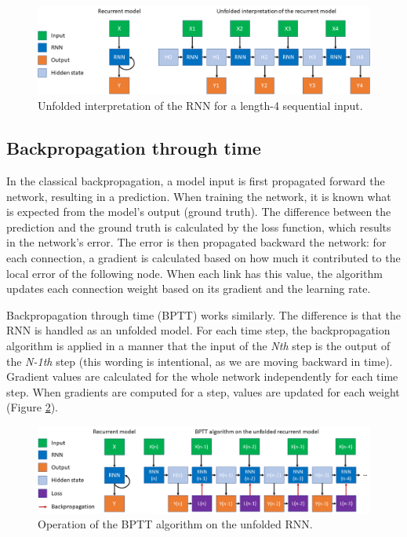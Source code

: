 \begin{figure}[htb]
 \centerline{\includegraphics[width=1.0\columnwidth]{.//Figure/Sequential/RNN.png}}
 \caption{Unfolded interpretation of the RNN for a length-4 sequential input.}
 \label{fig:RNN}
\end{figure}

\subsection{Backpropagation through time}

In the classical backpropagation, a model input is first propagated forward the network, resulting in a prediction. When training the network, it is known what is expected from the model's output (ground truth). The difference between the prediction and the ground truth is calculated by the loss function, which results in the network's error. The error is then propagated backward the network: for each connection, a gradient is calculated based on how much it contributed to the local error of the following node. When each link has this value, the algorithm updates each connection weight based on its gradient and the learning rate.

Backpropagation through time\cite{SequentialLecture} (BPTT) works similarly. The difference is that the RNN is handled as an unfolded model. For each time step, the backpropagation algorithm is applied in a manner that the input of the \textit{Nth} step is the output of the \textit{N-1th} step (this wording is intentional, as we are moving backward in time). Gradient values are calculated for the whole network independently for each time step. When gradients are computed for a step, values are updated for each weight (Figure \ref{fig:BPTT}).

\begin{figure}[htb]
 \centerline{\includegraphics[width=1.0\columnwidth]{.//Figure/Sequential/BPTT.png}}
 \caption{Operation of the BPTT algorithm on the unfolded RNN.}
 \label{fig:BPTT}
\end{figure}

